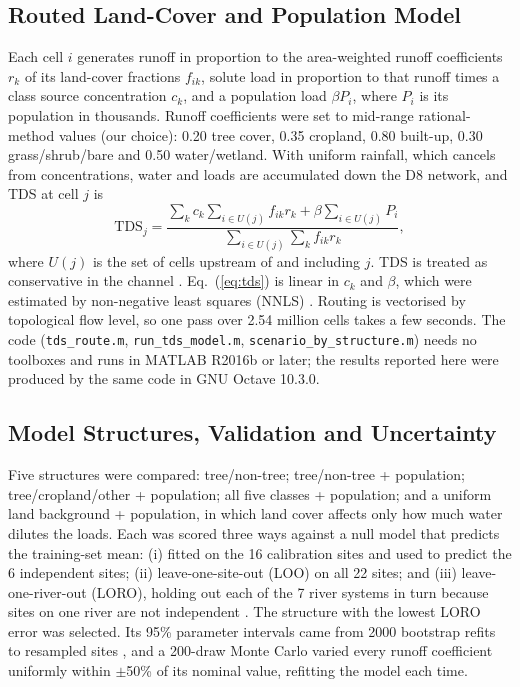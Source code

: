 \documentclass[10pt,twocolumn,letterpaper]{article}
\begin{document}
\subsection{Routed Land-Cover and Population Model}
Each cell $i$ generates runoff in proportion to the area-weighted runoff coefficients $r_k$ of its land-cover fractions $f_{ik}$, solute load in proportion to that runoff times a class source concentration $c_k$, and a population load $\beta P_i$, where $P_i$ is its population in thousands. Runoff coefficients were set to mid-range rational-method values \cite{chow} (our choice): 0.20 tree cover, 0.35 cropland, 0.80 built-up, 0.30 grass/shrub/bare and 0.50 water/wetland. With uniform rainfall, which cancels from concentrations, water and loads are accumulated down the D8 network, and TDS at cell $j$ is
\begin{equation}
\mathrm{TDS}_j=\frac{\sum_k c_k\sum_{i\in U(j)} f_{ik}r_k+\beta\sum_{i\in U(j)}P_i}{\sum_{i\in U(j)}\sum_k f_{ik}r_k},
\label{eq:tds}
\end{equation}
where $U(j)$ is the set of cells upstream of and including $j$. TDS is treated as conservative in the channel \cite{johnes,sparrow}. Eq.~(\ref{eq:tds}) is linear in $c_k$ and $\beta$, which were estimated by non-negative least squares (NNLS) \cite{lawson}. Routing is vectorised by topological flow level, so one pass over 2.54 million cells takes a few seconds. The code (\texttt{tds\_route.m}, \texttt{run\_tds\_model.m}, \texttt{scenario\_by\_structure.m}) needs no toolboxes and runs in MATLAB R2016b or later; the results reported here were produced by the same code in GNU Octave 10.3.0.

\subsection{Model Structures, Validation and Uncertainty}
Five structures were compared: tree/non-tree; tree/non-tree + population; tree/cropland/other + population; all five classes + population; and a uniform land background + population, in which land cover affects only how much water dilutes the loads. Each was scored three ways against a null model that predicts the training-set mean: (i) fitted on the 16 calibration sites and used to predict the 6 independent sites; (ii) leave-one-site-out (LOO) on all 22 sites; and (iii) leave-one-river-out (LORO), holding out each of the 7 river systems in turn because sites on one river are not independent \cite{roberts}. The structure with the lowest LORO error was selected. Its 95\% parameter intervals came from 2000 bootstrap refits to resampled sites \cite{efron}, and a 200-draw Monte Carlo varied every runoff coefficient uniformly within $\pm$50\% of its nominal value, refitting the model each time.
\end{document}
